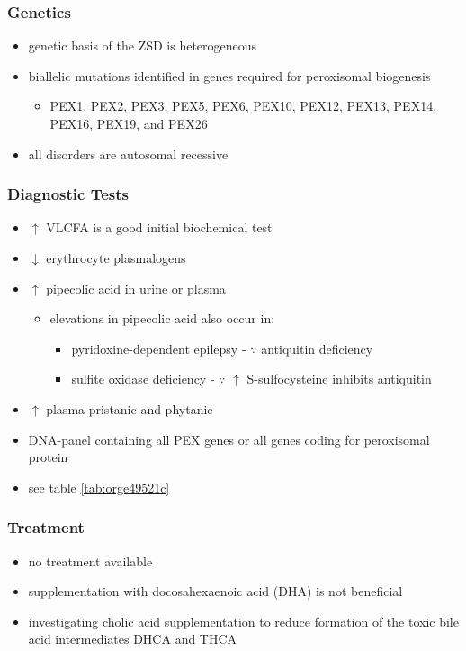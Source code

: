 \documentclass[12pt]{scrartcl}
\begin{document}
\subsubsection{Genetics}
\label{sec:org89ecc69}
\begin{itemize}
\item genetic basis of the ZSD is heterogeneous
\item biallelic mutations identified in genes required for peroxisomal biogenesis
\begin{itemize}
\item PEX1, PEX2, PEX3, PEX5, PEX6, PEX10, PEX12, PEX13, PEX14, PEX16, PEX19, and PEX26
\end{itemize}
\item all disorders are autosomal recessive
\end{itemize}

\subsubsection{Diagnostic Tests}
\label{sec:org0685f8d}
\begin{itemize}
\item \(\uparrow\) VLCFA is a good initial biochemical test
\item \(\downarrow\) erythrocyte plasmalogens
\item \(\uparrow\) pipecolic acid in urine or plasma
\begin{itemize}
\item elevations in pipecolic acid also occur in:
\begin{itemize}
\item pyridoxine-dependent epilepsy - \(\because\) antiquitin deficiency
\item sulfite oxidase deficiency - \(\because\) \(\uparrow\) S-sulfocysteine inhibits antiquitin
\end{itemize}
\end{itemize}
\item \(\uparrow\) plasma pristanic and phytanic
\item DNA-panel containing all PEX genes or all genes coding for
peroxisomal protein
\item see table \ref{tab:orge49521c}
\end{itemize}
\subsubsection{Treatment}
\label{sec:orgff64d1a}
\begin{itemize}
\item no treatment available
\item supplementation with docosahexaenoic acid (DHA) is not beneficial
\item investigating cholic acid supplementation to reduce formation of the
toxic bile acid intermediates DHCA and THCA
\end{itemize}
\end{document}
